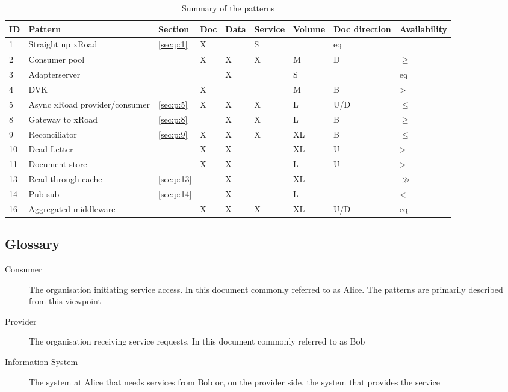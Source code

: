\documentclass[10pt,a4paper]{article}
\begin{document}
\begin{table}
	\begin{center}
		\begin{tabular}{p{.5cm}p{3.4cm}p{.9cm}p{.7cm}p{.7cm}p{.8cm}p{.8cm}p{1.2cm}p{1.2cm}}
		\toprule
ID & Pattern & Section & Doc & Data & Service & Volume & Doc direction & Availability \\
\midrule
1 & Straight up xRoad & \ref{sec:p:1} & X &  & S &   & eq \\
2 & Consumer pool & & X & X & X & M & D & $\geq$ \\
3 & Adapterserver & &  & X &  & S &   & eq \\
4 & DVK & & X &  &  & M & B & > \\
5 & Async xRoad provider/consumer & \ref{sec:p:5}  & X & X & X & L & U/D & $\leq$ \\
8 & Gateway to xRoad & \ref{sec:p:8}  &  & X & X & L &  B & $\geq$ \\
9 & Reconciliator  & \ref{sec:p:9} & X & X & X & XL & B & $\leq$ \\
10 & Dead Letter & & X & X &  & XL & U & > \\
11 & Document store &  & X & X &  & L & U & > \\
13 & Read-through cache  & \ref{sec:p:13}  &  & X &  & XL &   & $\gg$ \\
14 & Pub-sub  & \ref{sec:p:14} &  & X &  & L &  & < \\
16 & Aggregated middleware & & X & X & X & XL & U/D & eq \\
\bottomrule
		\end{tabular}
		\caption{Summary of the patterns}
		\label{tab:dir}
	\end{center}
\end{table}

\subsection{Glossary}
\begin{description}
	\item[Consumer] The organisation initiating service access. In this document commonly referred to as Alice. The patterns are primarily described from this viewpoint
	\item[Provider] The organisation receiving service requests. In this document commonly referred to as Bob 
	\item[Information System] The system at Alice that needs services from Bob or, on the provider side, the system that provides the service
\end{description}
\end{document}
